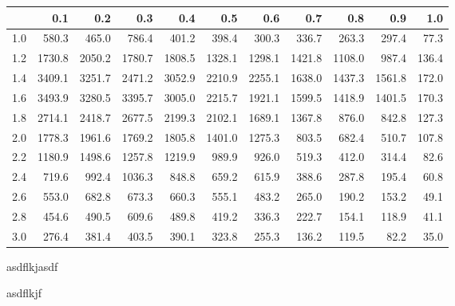 \begin{tabular}{r|rrrrrrrrrr}
  \hline
 & 0.1 & 0.2 & 0.3 & 0.4 & 0.5 & 0.6 & 0.7 & 0.8 & 0.9 & 1.0 \\ 
  \hline
1.0 & 580.3 & 465.0 & 786.4 & 401.2 & 398.4 & 300.3 & 336.7 & 263.3 & 297.4 & 77.3 \\ 
  1.2 & 1730.8 & 2050.2 & 1780.7 & 1808.5 & 1328.1 & 1298.1 & 1421.8 & 1108.0 & 987.4 & 136.4 \\ 
  1.4 & 3409.1 & 3251.7 & 2471.2 & 3052.9 & 2210.9 & 2255.1 & 1638.0 & 1437.3 & 1561.8 & 172.0 \\ 
  1.6 & 3493.9 & 3280.5 & 3395.7 & 3005.0 & 2215.7 & 1921.1 & 1599.5 & 1418.9 & 1401.5 & 170.3 \\ 
  1.8 & 2714.1 & 2418.7 & 2677.5 & 2199.3 & 2102.1 & 1689.1 & 1367.8 & 876.0 & 842.8 & 127.3 \\ 
  2.0 & 1778.3 & 1961.6 & 1769.2 & 1805.8 & 1401.0 & 1275.3 & 803.5 & 682.4 & 510.7 & 107.8 \\ 
  2.2 & 1180.9 & 1498.6 & 1257.8 & 1219.9 & 989.9 & 926.0 & 519.3 & 412.0 & 314.4 & 82.6 \\ 
  2.4 & 719.6 & 992.4 & 1036.3 & 848.8 & 659.2 & 615.9 & 388.6 & 287.8 & 195.4 & 60.8 \\ 
  2.6 & 553.0 & 682.8 & 673.3 & 660.3 & 555.1 & 483.2 & 265.0 & 190.2 & 153.2 & 49.1 \\ 
  2.8 & 454.6 & 490.5 & 609.6 & 489.8 & 419.2 & 336.3 & 222.7 & 154.1 & 118.9 & 41.1 \\ 
  3.0 & 276.4 & 381.4 & 403.5 & 390.1 & 323.8 & 255.3 & 136.2 & 119.5 & 82.2 & 35.0 \\ 
   \hline
\end{tabular}

asdflkjasdf


asdflkjf

